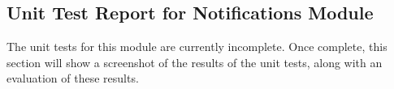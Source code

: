 \documentclass[11pt,fleqn]{book} %
\begin{document}
		\subsection{Unit Test Report for Notifications Module}
			The unit tests for this module are currently incomplete. Once complete, this section will show a screenshot of the results of the unit tests, along with an evaluation of these results.





	


	


	
\end{document}
